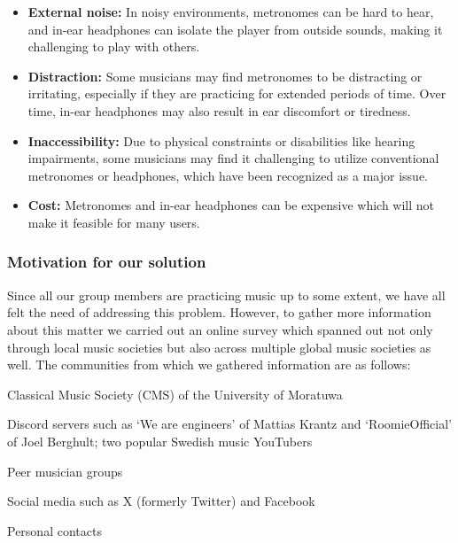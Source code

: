 \documentclass{article}
\begin{document}
        \begin{itemize}
                \item \textbf{External noise:} In noisy environments, metronomes can be hard to hear, and in-ear headphones can isolate the player from outside sounds, making it challenging to play with others.
                \item \textbf{Distraction:} Some musicians may find metronomes to be distracting or irritating, especially if they are practicing for extended periods of time. Over time, in-ear headphones may also result in ear discomfort or tiredness.
                \item \textbf{Inaccessibility:} Due to physical constraints or disabilities like hearing impairments, some musicians may find it challenging to utilize conventional metronomes or headphones, which have been recognized as a major issue.
                \item \textbf{Cost:} Metronomes and in-ear headphones can be expensive which will not make it feasible for many users.
        \end{itemize}

        \subsubsection{Motivation for our solution}
        Since all our group members are practicing music up to some extent, we have all felt the need of addressing this problem. However, to gather more information about this matter we carried out an online survey which spanned out not only through local music societies but also across multiple global music societies as well. The communities from which we gathered information are as follows:

        \begin{compactitem}
                \item Classical Music Society (CMS) of the University of Moratuwa
                \item Discord servers such as ‘We are engineers’ of Mattias Krantz and ‘RoomieOfficial’ of Joel Berghult; two popular Swedish music YouTubers
                \item Peer musician groups
                \item Social media such as X (formerly Twitter) and Facebook
                \item Personal contacts
        \end{compactitem}
\end{document}
